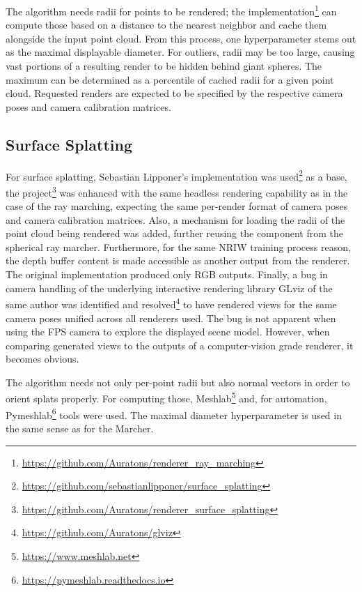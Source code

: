 The algorithm needs radii for points to be rendered; the
implementation\footnote{\url{https://github.com/Auratons/renderer_ray_marching}} can
compute those based on a distance to the nearest neighbor and cache them alongside the
input point cloud. From this process, one hyperparameter stems out as the maximal displayable
diameter. For outliers, radii may be too large, causing vast portions of a resulting
render to be hidden behind giant spheres. The maximum can be determined as a percentile
of cached radii for a given point cloud. Requested renders are expected to be
specified by the respective camera poses and camera calibration matrices.


\subsection{Surface Splatting}

For surface splatting, Sebastian Lipponer's implementation was
used\footnote{\url{https://github.com/sebastianlipponer/surface_splatting}} as a base, the
project\footnote{\url{https://github.com/Auratons/renderer_surface_splatting}} was
enhanced with the same headless rendering capability as in the case of the ray marching,
expecting the same per-render format of camera poses and camera calibration matrices.
Also, a mechanism for loading the radii of the point cloud being rendered was added, further
reusing the component from the spherical ray marcher. Furthermore, for the same NRIW
training process reason, the depth buffer content is made accessible as another output from
the renderer. The original implementation produced only RGB outputs. Finally, a bug in
camera handling of the underlying interactive rendering library GLviz of the same author
was identified and resolved\footnote{\url{https://github.com/Auratons/glviz}} to have
rendered views for the same camera poses unified across all renderers used. The bug is
not apparent when using the FPS camera to explore the displayed scene model. However,
when comparing generated views to the outputs of a computer-vision grade renderer, it becomes obvious.

The algorithm needs not only per-point radii but also normal vectors in order to orient
splats properly. For computing those, Meshlab\footnote{\url{https://www.meshlab.net}} and,
for automation, Pymeshlab\footnote{\url{https://pymeshlab.readthedocs.io}} tools were
used. The maximal diameter hyperparameter is used in the same sense as for the Marcher.



